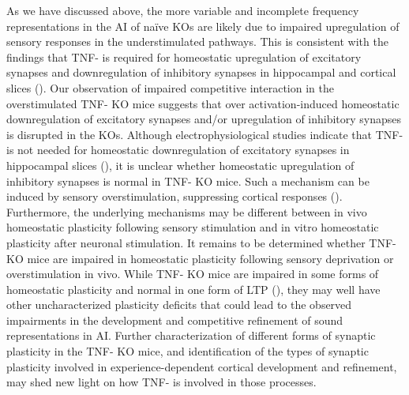 As we have discussed above, the more variable and incomplete frequency representations in the AI of na\"ive KOs are likely due to impaired upregulation of sensory responses in the understimulated pathways. This is consistent with the findings that TNF-\textalpha{} is required for homeostatic upregulation of excitatory synapses and downregulation of inhibitory synapses in hippocampal and cortical slices (\cite{Stellwagen2006, Kaneko2008}). Our observation of impaired competitive interaction in the overstimulated TNF-\textalpha{} KO mice suggests that over activation-induced homeostatic downregulation of excitatory synapses and/or upregulation of inhibitory synapses is disrupted in the KOs. Although electrophysiological studies indicate that TNF-\textalpha{} is not needed for homeostatic downregulation of excitatory synapses in hippocampal slices (\cite{Stellwagen2006}), it is unclear whether homeostatic upregulation of inhibitory synapses is normal in TNF-\textalpha{} KO mice. Such a mechanism can be induced by sensory overstimulation, suppressing cortical responses (\cite{Knott2002}). Furthermore, the underlying mechanisms may be different between in vivo homeostatic plasticity following sensory stimulation and in vitro homeostatic plasticity after neuronal stimulation. It remains to be determined whether TNF-\textalpha{} KO mice are impaired in homeostatic plasticity following sensory deprivation or overstimulation in vivo. While TNF-\textalpha{} KO mice are impaired in some forms of homeostatic plasticity and normal in one form of LTP (\cite{Stellwagen2006, Kaneko2008}), they may well have other uncharacterized plasticity deficits that could lead to the observed impairments in the development and competitive refinement of sound representations in AI. Further characterization of different forms of synaptic plasticity in the TNF-\textalpha{} KO mice, and identification of the types of synaptic plasticity involved in experience-dependent cortical development and refinement, may shed new light on how TNF-\textalpha{} is involved in those processes.

